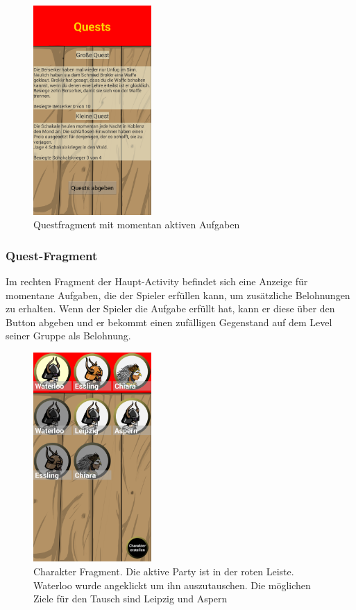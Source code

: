 \documentclass[extern,palatino]{cgBA}
\begin{document}
\newpage
\begin{figure}[H] 
		\centering
		\includegraphics[width=0.4\textwidth]{questfragment.png}
		\caption{Questfragment mit momentan aktiven Aufgaben}
		\label{fig:Bild3}
\end{figure}
\subsubsection{Quest-Fragment}
Im rechten Fragment der Haupt-Activity befindet sich eine Anzeige für momentane Aufgaben, die der Spieler erfüllen kann, um zusätzliche Belohnungen zu erhalten. Wenn der Spieler die Aufgabe erfüllt hat, kann er diese über den Button abgeben und er bekommt einen zufälligen Gegenstand auf dem Level seiner Gruppe als Belohnung.
	
	
\newpage
\begin{figure}[H] 
		\centering
		\includegraphics[width=0.4\textwidth]{charfragment.png}
		\caption{Charakter Fragment. Die aktive Party ist in der roten Leiste. Waterloo wurde angeklickt um ihn auszutauschen. Die möglichen Ziele für den Tausch sind Leipzig und Aspern}
		\label{fig:Bild2}
\end{figure} 
\end{document}
